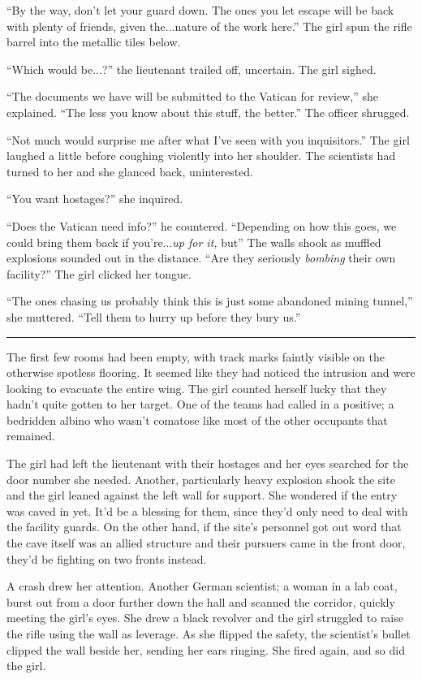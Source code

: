 \begin{Standard}
``By the way, don't let your guard down. The ones you let escape will be back with
plenty of friends, given the...nature of the work here.'' The girl spun the rifle
barrel into the metallic tiles below.

``Which would be...?'' the lieutenant trailed off, uncertain. The girl sighed.

``The documents we have will be submitted to the Vatican for review,'' she explained.
``The less you know about this stuff, the better.'' The officer shrugged.

``Not much would surprise me after what I've seen with you inquisitors.'' The girl
laughed a little before coughing violently into her shoulder. The scientists had turned
to her and she glanced back, uninterested.

``You want hostages?'' she inquired.

``Does the Vatican need info?'' he countered. ``Depending on how this goes, we could
bring them back if you're...\emph{up for it,} but\textemdash{}'' The walls shook
as muffled explosions sounded out in the distance. ``Are they seriously \emph{bombing}
their own facility?'' The girl clicked her tongue.

``The ones chasing us probably think this is just some abandoned mining tunnel,'' she
muttered. ``Tell them to hurry up before they bury us.''

\fancybreak{* * *}

The first few rooms had been empty, with track marks faintly visible on the otherwise
spotless flooring. It seemed like they had noticed the intrusion and were looking to
evacuate the entire wing. The girl counted herself lucky that they hadn't quite gotten
to her target. One of the teams had called in a positive; a bedridden albino who wasn't
comatose like most of the other occupants that remained.

The girl had left the lieutenant with their hostages and her eyes searched for the
door number she needed. Another, particularly heavy explosion shook the site and the girl
leaned against the left wall for support. She wondered if the entry was caved in yet.
It'd be a blessing for them, since they'd only need to deal with the facility guards.
On the other hand, if the site's personnel got out word that the cave itself was an allied
structure and their pursuers came in the front door, they'd be fighting on two fronts
instead.

A crash drew her attention. Another German scientist; a woman in a lab coat, burst out
from a door further down the hall and scanned the corridor, quickly meeting the girl's
eyes. She drew a black revolver and the girl struggled to raise the rifle using the
wall as leverage. As she flipped the safety, the scientist's bullet clipped the wall
beside her, sending her ears ringing. She fired again, and so did the girl.


\end{Standard}
